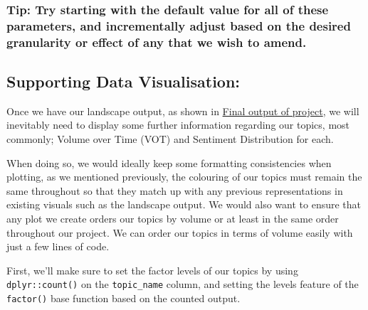 \documentclass[
  letterpaper,
  DIV=11,
  numbers=noendperiod]{scrreprt}
\newenvironment{Shaded}{\begin{snugshade}}{\end{snugshade}}
\newcommand{\AttributeTok}[1]{\textcolor[rgb]{0.40,0.45,0.13}{#1}}
\newcommand{\CommentTok}[1]{\textcolor[rgb]{0.37,0.37,0.37}{#1}}
\newcommand{\ConstantTok}[1]{\textcolor[rgb]{0.56,0.35,0.01}{#1}}
\newcommand{\FunctionTok}[1]{\textcolor[rgb]{0.28,0.35,0.67}{#1}}
\newcommand{\NormalTok}[1]{\textcolor[rgb]{0.00,0.23,0.31}{#1}}
\newcommand{\OtherTok}[1]{\textcolor[rgb]{0.00,0.23,0.31}{#1}}
\newcommand{\SpecialCharTok}[1]{\textcolor[rgb]{0.37,0.37,0.37}{#1}}
\begin{document}
\subsubsection{Tip: Try starting with the default value for all of these
parameters, and incrementally adjust based on the desired granularity or
effect of any that we wish to
amend.}\label{tip-try-starting-with-the-default-value-for-all-of-these-parameters-and-incrementally-adjust-based-on-the-desired-granularity-or-effect-of-any-that-we-wish-to-amend.}

\subsection{Supporting Data
Visualisation:}\label{supporting-data-visualisation}

Once we have our landscape output, as shown in
\href{http://localhost:6377/conversation_landscape.html\#final-output-of-project}{Final
output of project}, we will inevitably need to display some further
information regarding our topics, most commonly; Volume over Time (VOT)
and Sentiment Distribution for each.

When doing so, we would ideally keep some formatting consistencies when
plotting, as we mentioned previously, the colouring of our topics must
remain the same throughout so that they match up with any previous
representations in existing visuals such as the landscape output. We
would also want to ensure that any plot we create orders our topics by
volume or at least in the same order throughout our project. We can
order our topics in terms of volume easily with just a few lines of
code.

First, we'll make sure to set the factor levels of our topics by using
\texttt{dplyr::count()} on the \texttt{topic\_name} column, and setting
the levels feature of the \texttt{factor()} base function based on the
counted output.

\begin{Shaded}
\end{Shaded}
\end{document}
